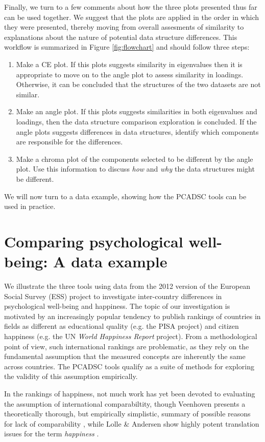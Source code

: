 \documentclass[a4paper,12pt]{article}
\begin{document}
Finally, we turn to a few comments about how the three plots presented thus far can be used together. We suggest that the plots are applied in the  order in which they were presented, thereby moving from overall assesments of similarity to explanations about the nature of potential data structure differences. This workflow is summarized in Figure \ref{fig:flowchart} and should follow three steps:
\begin{enumerate}
\item Make a CE plot. If this plots suggests similarity in eigenvalues then it is appropriate to move on to the angle plot to assess similarity in loadings. Otherwise, it can be concluded that the structures of the two datasets are not similar. 
\item Make an angle plot. If this plots suggests similarities in both eigenvalues and loadings, then the data structure comparison exploration is concluded. If the angle plots suggests differences in data structures, identify which components are responsible for the differences. 
\item Make a chroma plot of the components selected to be different by the angle plot. Use this information to discuss \textit{how} and \textit{why} the data structures might be different. 
\end{enumerate}
We will now turn to a data example, showing how the PCADSC tools can be used in practice.


\section*{Comparing psychological well-being: A data example}\label{sec:dataexample}


We illustrate the three tools using data from the 2012 version of the European Social Survey (ESS) project to investigate inter-country differences in psychological well-being and happiness. The topic of our investigation is motivated by an increasingly popular tendency to publish rankings of countries in fields as different as educational quality (e.g. the PISA project) and citizen happiness (e.g. the UN \textit{World Happiness Report} project). From a methodological point of view, such international rankings are problematic, as they rely on the fundamental assumption that the measured concepts are inherently the same across countries. The PCADSC tools qualify as a suite of methods for exploring the validity of this assumption empirically.

In the rankings of happiness, not much work has yet been devoted to evaluating the assumption of international comparabiltity, though Veenhoven presents a theoretically thorough, but empirically simplistic, summary of possible reasons for lack of comparability \cite{Veenhoven2012}, while Lolle \& Andersen show highly potent translation issues for the term \textit{happiness} \cite{Lolle2016}.
\end{document}

